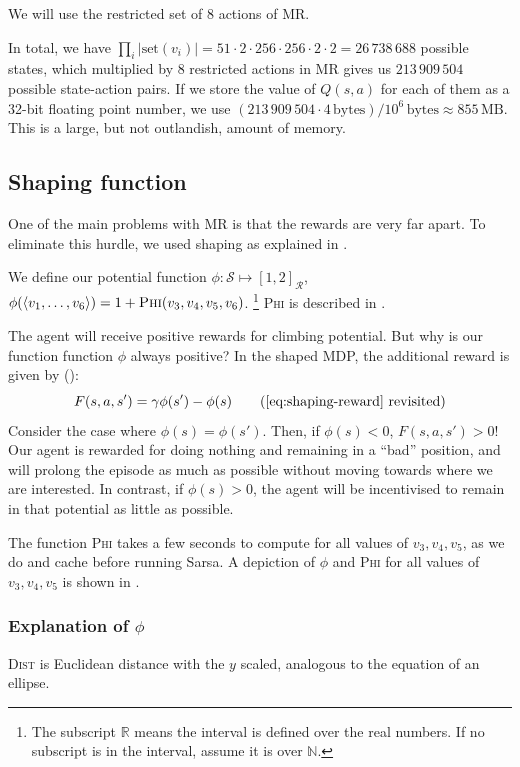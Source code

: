 We will use the restricted set of 8 actions of \acl{MR}.

In total, we have $\prod_i |\text{set}(v_i)| = 51 \cdot 2 \cdot 256 \cdot 256
\cdot 2 \cdot 2 = 26\,738\,688$ possible states, which multiplied by 8
restricted actions in \acl{MR} gives us $213\,909\,504$ possible state-action
pairs. If we store the value of $Q(s, a)$ for each of them as a 32-bit floating
point number, we use $(213\,909\,504 \cdot 4 \,\text{bytes}) / 10^6 \,\text{bytes}
\approx 855\,\text{MB}$. This is a large, but not outlandish, amount of memory.

\subsection{Shaping function\label{subsec:shaping-function}}
One of the main problems with \acl{MR} is that the rewards are very far apart.
To eliminate this hurdle, we used shaping as explained in .

We define our potential function $\phi : \mathcal{S} \mapsto [1,
2]_\mathcal{R}$, $\phi(\langle v_1,\dots,v_6\rangle ) = 1 +
\textsc{Phi}(v_3,v_4,v_5,v_6)$. \footnote{The subscript $\mathbb{R}$ means the interval is
defined over the real numbers. If no subscript is in the interval, assume it is
over $\mathbb{N}$.} \textsc{Phi} is described in
.

The agent will receive positive rewards for climbing potential. But why is our function
function $\phi$ always positive? In the shaped \ac{MDP}, the additional reward
is given by ():
\begin{equation}
  F(s, a, s') = \gamma \phi(s') - \phi(s)
  \tag{\ref{eq:shaping-reward} revisited}
\end{equation}
Consider the case where $\phi(s) = \phi(s')$. Then, if $\phi(s) < 0$, $F(s, a,
s') > 0$! Our agent is rewarded for doing nothing and remaining in a ``bad''
position, and will prolong the episode as much as possible without moving
towards where we are interested. In contrast, if $\phi(s) > 0$, the agent will
be incentivised to remain in that potential as little as possible.

The function \textsc{Phi} takes a few seconds to compute for all values of
$v_3,v_4,v_5$, as we do and cache before running Sarsa. A depiction of $\phi$ and
\textsc{Phi} for all values of $v_3,v_4,v_5$ is shown in .

\subsubsection{\texorpdfstring{Explanation of $\phi$}{Explanation of φ}}
\textsc{Dist} is Euclidean distance with the $y$ scaled, analogous to the
equation of an ellipse.


